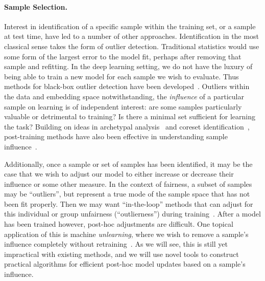 \paragraph{Sample Selection.}
Interest in identification of a specific sample within the training set, or a sample at test time, 
have led to a number of other approaches.
Identification in the most classical sense takes the form of outlier detection.
Traditional statistics would use some form of the largest error to the model fit,
perhaps after removing that sample and refitting.
In the deep learning setting, we do not have the luxury of 
being able to train a new model for each sample we wish to evaluate.
Thus methods for black-box outlier detection have been developed~\citep{huang2020feature,ren2019likelihood}.
Outliers within the data and embedding space notwithstanding,
the \textit{influence} of a particular sample on learning is of independent interest:
are some samples particularly valuable or detrimental to training?
Is there a minimal set sufficient for learning the task?
Building on ideas in archetypal analysis~\citep{cutler1994archetypal} and coreset identification~\citep{agarwal2005geometric,ravi2019deterministic},
post-training methods have also been effective in understanding
sample influence~\citep{koh2017understanding,golatkar2020eternal,huang2020feature}.

Additionally, once a sample or set of samples has been identified,
it may be the case that we wish to adjust
our model to either increase or decrease their influence or some other measure.
In the context of fairness, a subset of samples may be ``outliers'', but
represent a true mode of the sample space that has not been fit properly.
Then we may want ``in-the-loop'' methods that can adjust
for this individual or group unfairness (``outlierness'') during training~\citep{mehrabi2021survey}.
After a model has been trained however, post-hoc adjustments are difficult.
One topical application of this is machine \textit{unlearning},
where we wish to remove a sample's influence completely without retraining~\citep{bourtoule2021machine,cao2015towards}.
As we will see, this is still yet impractical with existing methods,
and we will use novel tools to construct practical algorithms
for efficient post-hoc model updates based on a sample's influence.

